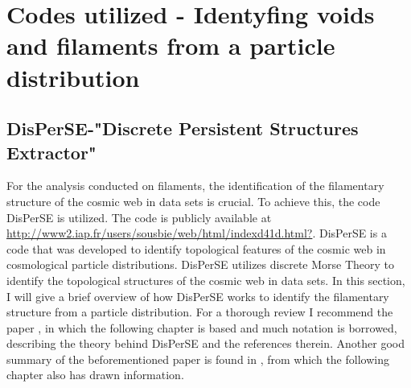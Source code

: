 \chapter{Codes utilized - Identyfing voids and filaments from a particle distribution}\label{sec:codesused}
\section{DisPerSE-"Discrete Persistent Structures Extractor"}
For the analysis conducted on filaments, the identification of the filamentary structure of the cosmic web in
data sets is crucial. To achieve this, the code
DisPerSE\cite{2011MNRAS.414..350S}\cite{2011MNRAS.414..384S} is utilized. The
code is publicly available at \url{http://www2.iap.fr/users/sousbie/web/html/indexd41d.html?}.
DisPerSE is a code that was developed to identify topological features of the
cosmic web in cosmological particle distributions. DisPerSE utilizes discrete
Morse Theory to identify the topological structures of the cosmic web in data
sets. In this section, I will give a brief overview of how DisPerSE works to
identify the filamentary structure from a particle distribution. For a thorough
review I recommend the paper \cite{2011MNRAS.414..350S}, in which the following
chapter is based and much notation is borrowed, describing the theory behind DisPerSE and the
references therein. Another good summary of the beforementioned paper is found in \cite{Alexhothesis}, from which the following chapter also has drawn information.

